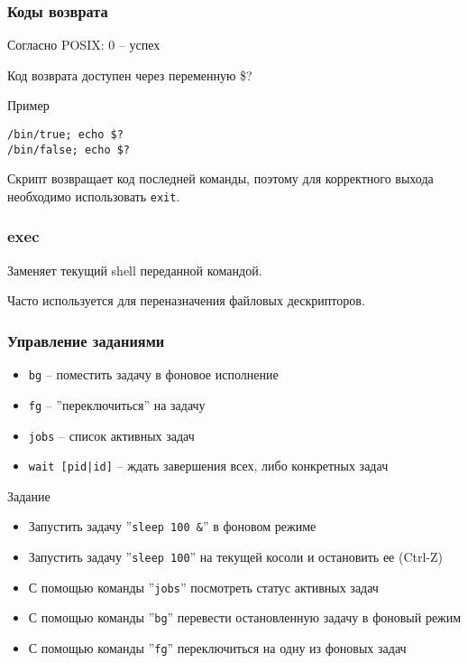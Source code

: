 \begin{frame}[fragile]
	\frametitle{Коды возврата}

	Согласно POSIX: 0 -- успех

	Код возврата доступен через переменную \$?

	\pause
	\begin{block}{Пример}
		\begin{lstlisting}
/bin/true; echo $?
/bin/false; echo $?
		\end{lstlisting}
	\end{block}

	Скрипт возвращает код последней команды, поэтому для корректного выхода необходимо использовать {\tt exit}.

\end{frame}


\begin{frame}
	\frametitle{exec}

	Заменяет текущий shell переданной командой. 

	Часто используется для переназначения файловых дескрипторов.

\end{frame}

\begin{frame}
	\frametitle{Управление заданиями}
	
	\begin{itemize}
		\item {\tt bg} -- поместить задачу в фоновое исполнение
		\item {\tt fg} -- ''переключиться'' на задачу
		\item {\tt jobs} -- список активных задач
		\item {\tt wait [pid|id]} -- ждать завершения всех, либо конкретных задач
	\end{itemize}
	\pause
	\begin{block}{Задание}
		\begin{itemize}
			\item Запустить задачу ''{\tt sleep 100 \&}'' в фоновом режиме
			\item Запустить задачу ''{\tt sleep 100}'' на текущей косоли и остановить ее (Ctrl-Z)
			\item С помощью команды ''{\tt jobs}'' посмотреть статус активных задач
			\item С помощью команды ''{\tt bg}'' перевести остановленную задачу в фоновый режим
			\item С помощью команды ''{\tt fg}'' переключиться на одну из фоновых задач
		\end{itemize}
	\end{block}
\end{frame}




